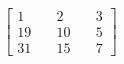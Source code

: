 \documentclass[preview]{standalone}
\begin{document}
\begin{align*}
\begin{bmatrix} 1 & \quad 2 & \quad 3 \\ 19 & \quad 10 & \quad 5 \\ 31 & \quad 15 & \quad 7 \end{bmatrix}
\end{align*}
\end{document}
